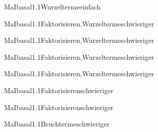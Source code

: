 \documentclass[12pt]{article}
\begin{document}
\begin{Add}{MaI}{basal1.1}{Wurzelterme}{einfach}
\end{Add}

\begin{Add}{MaI}{basal1.1}{Faktorisieren,Wurzelterme}{schwieriger}
\end{Add}

\begin{Add}{MaI}{basal1.1}{Faktorisieren,Wurzelterme}{schwieriger}
\end{Add}

\begin{Add}{MaI}{basal1.1}{Faktorisieren,Wurzelterme}{schwieriger}
\end{Add}
\begin{Add}{MaI}{basal1.1}{Faktorisieren,Wurzelterme}{schwieriger}
\end{Add}

\begin{Add}{MaI}{basal1.1}{Faktorisieren}{schwieriger}
\end{Add}

\begin{Add}{MaI}{basal1.1}{Faktorisieren}{schwieriger}
\end{Add}

\begin{Add}{MaI}{basal1.1}{Bruchterme}{schwieriger}
\end{Add}
\end{document}
